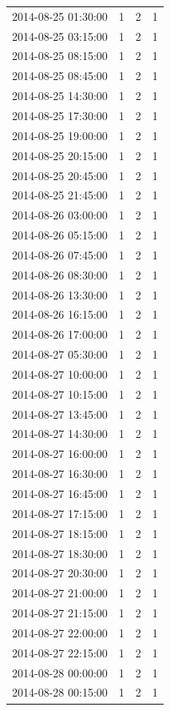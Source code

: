 \begin{tabular}{lrrr}
2014-08-25 01:30:00 & 1 & 2 & 1 \\
2014-08-25 03:15:00 & 1 & 2 & 1 \\
2014-08-25 08:15:00 & 1 & 2 & 1 \\
2014-08-25 08:45:00 & 1 & 2 & 1 \\
2014-08-25 14:30:00 & 1 & 2 & 1 \\
2014-08-25 17:30:00 & 1 & 2 & 1 \\
2014-08-25 19:00:00 & 1 & 2 & 1 \\
2014-08-25 20:15:00 & 1 & 2 & 1 \\
2014-08-25 20:45:00 & 1 & 2 & 1 \\
2014-08-25 21:45:00 & 1 & 2 & 1 \\
2014-08-26 03:00:00 & 1 & 2 & 1 \\
2014-08-26 05:15:00 & 1 & 2 & 1 \\
2014-08-26 07:45:00 & 1 & 2 & 1 \\
2014-08-26 08:30:00 & 1 & 2 & 1 \\
2014-08-26 13:30:00 & 1 & 2 & 1 \\
2014-08-26 16:15:00 & 1 & 2 & 1 \\
2014-08-26 17:00:00 & 1 & 2 & 1 \\
2014-08-27 05:30:00 & 1 & 2 & 1 \\
2014-08-27 10:00:00 & 1 & 2 & 1 \\
2014-08-27 10:15:00 & 1 & 2 & 1 \\
2014-08-27 13:45:00 & 1 & 2 & 1 \\
2014-08-27 14:30:00 & 1 & 2 & 1 \\
2014-08-27 16:00:00 & 1 & 2 & 1 \\
2014-08-27 16:30:00 & 1 & 2 & 1 \\
2014-08-27 16:45:00 & 1 & 2 & 1 \\
2014-08-27 17:15:00 & 1 & 2 & 1 \\
2014-08-27 18:15:00 & 1 & 2 & 1 \\
2014-08-27 18:30:00 & 1 & 2 & 1 \\
2014-08-27 20:30:00 & 1 & 2 & 1 \\
2014-08-27 21:00:00 & 1 & 2 & 1 \\
2014-08-27 21:15:00 & 1 & 2 & 1 \\
2014-08-27 22:00:00 & 1 & 2 & 1 \\
2014-08-27 22:15:00 & 1 & 2 & 1 \\
2014-08-28 00:00:00 & 1 & 2 & 1 \\
2014-08-28 00:15:00 & 1 & 2 & 1 \\

\end{tabular}
